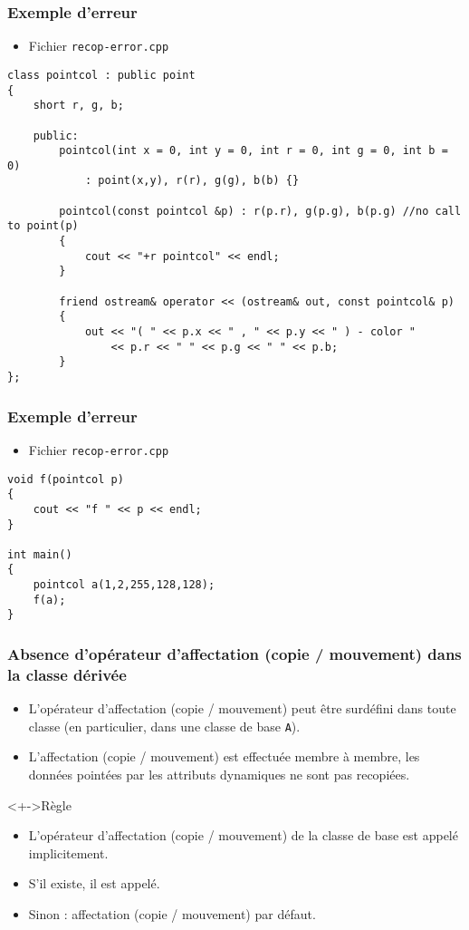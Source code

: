 \begin{frame}[containsverbatim]
\frametitle{Exemple d'erreur}
\begin{itemize}
\item Fichier \texttt{recop-error.cpp}
\end{itemize}
\begin{lstlisting}
class pointcol : public point
{
	short r, g, b;
	
	public:
		pointcol(int x = 0, int y = 0, int r = 0, int g = 0, int b = 0) 
			: point(x,y), r(r), g(g), b(b) {}		

		pointcol(const pointcol &p) : r(p.r), g(p.g), b(p.g) //no call to point(p)
		{
			cout << "+r pointcol" << endl;
		}	

		friend ostream& operator << (ostream& out, const pointcol& p)
		{
			out << "( " << p.x << " , " << p.y << " ) - color " 
			    << p.r << " " << p.g << " " << p.b;
		}
};
\end{lstlisting}
\end{frame}

\begin{frame}[containsverbatim]
\frametitle{Exemple d'erreur}
\begin{itemize}
\item Fichier \texttt{recop-error.cpp}
\end{itemize}
\begin{lstlisting}
void f(pointcol p)
{
	cout << "f " << p << endl;
}

int main()
{
	pointcol a(1,2,255,128,128);
	f(a);
}
\end{lstlisting}
\end{frame}

\begin{frame}
\frametitle{Absence d'opérateur d'affectation (copie / mouvement) dans la classe dérivée}
\begin{itemize}[<+->]
\item L'opérateur d'affectation (copie / mouvement) peut être surdéfini dans toute classe (en particulier, dans une classe de base \texttt{A}).
\item L'affectation (copie / mouvement) est effectuée membre à membre, les données pointées par les attributs dynamiques ne sont pas recopiées.
\end{itemize}
\begin{exampleblock}<+->{Règle}
	\begin{itemize}[<+->]
	\item L'opérateur d'affectation (copie / mouvement) de la classe de base est appelé implicitement.
	\end{itemize}
\end{exampleblock}
\begin{itemize}[<+->]
\item S'il existe, il est appelé.
\item Sinon : affectation (copie / mouvement) par défaut.
\end{itemize}
\end{frame}

